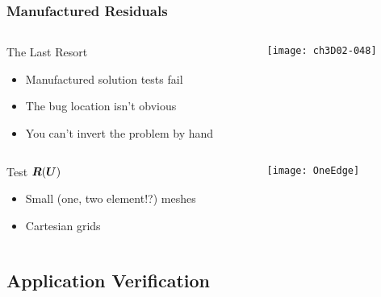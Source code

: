 \begin{frame}
\frametitle{Manufactured Residuals}
\begin{columns}
\begin{column}{.6\textwidth}
\begin{block}{The Last Resort}
\begin{itemize}
\item Manufactured solution tests fail
\item The bug location isn't obvious
\item You can't invert the problem by hand
\end{itemize}
\end{block}
\end{column}
\begin{column}{.4\textwidth}
\begin{center}
\texttt{[image: ch3D02-048]}
\end{center}
\end{column}
\end{columns}

\pause

\begin{columns}
\begin{column}{.6\textwidth}
\begin{block}{Test ${\boldsymbol{R}}({\boldsymbol{U}})$}
\begin{itemize}
\item Small (one, two element!?) meshes
\item Cartesian grids
\end{itemize}
\end{block}
\end{column}
\begin{column}{.4\textwidth}
\begin{center}
\texttt{[image: OneEdge]}
\end{center}
\end{column}
\end{columns}

\end{frame}

\subsection{Application Verification}


